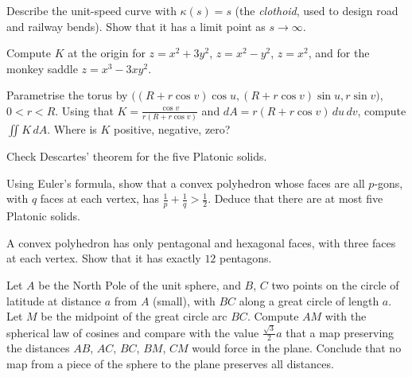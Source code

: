 \begin{exercise}[$\star\star$]\label{geometry:ex:clothoid}
Describe the unit-speed curve with $\kappa(s)=s$ (the \emph{clothoid}, used to design road and railway bends). Show that it has a limit point as $s\to\infty$.
\end{exercise}

\begin{exercise}[$\star$]\label{geometry:ex:surfacesK}
Compute $K$ at the origin for $z=x^2+3y^2$, $z=x^2-y^2$, $z=x^2$, and for the monkey saddle $z=x^3-3xy^2$.
\end{exercise}

\begin{exercise}[$\star\star$]\label{geometry:ex:torusK}
Parametrise the torus by $\bigl((R+r\cos v)\cos u,(R+r\cos v)\sin u,r\sin v\bigr)$, $0<r<R$. Using that $K=\frac{\cos v}{r(R+r\cos v)}$ and
$dA=r(R+r\cos v)\,du\,dv$, compute $\iint K\,dA$. Where is $K$ positive, negative, zero?
\end{exercise}

\begin{exercise}[$\star$]\label{geometry:ex:platonic}
Check Descartes' theorem for the five Platonic solids.
\end{exercise}

\begin{exercise}[$\star\star$]\label{geometry:ex:fiveplatonic}
Using Euler's formula, show that a convex polyhedron whose faces are all $p$-gons, with $q$ faces at each vertex, has $\frac1p+\frac1q>\frac12$. Deduce that there
are at most five Platonic solids.
\end{exercise}

\begin{exercise}[$\star$]\label{geometry:ex:football}
A convex polyhedron has only pentagonal and hexagonal faces, with three faces at each vertex. Show that it has exactly $12$ pentagons.
\end{exercise}

\begin{exercise}[$\star\star$]\label{geometry:ex:nomap}
Let $A$ be the North Pole of the unit sphere, and $B$, $C$ two points on the circle of latitude at distance $a$ from $A$ (small), with $BC$ along a great circle of length
$a$. Let $M$ be the midpoint of the great circle arc $BC$. Compute $AM$ with the spherical law of cosines and compare with the value $\frac{\sqrt3}2a$ that a map
preserving the distances $AB$, $AC$, $BC$, $BM$, $CM$ would force in the plane. Conclude that no map from a piece of the sphere to the plane preserves all distances.
\end{exercise}

